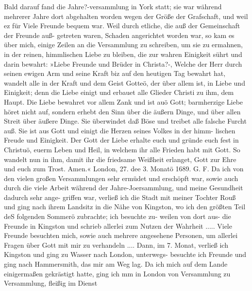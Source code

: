 Bald darauf fand die Jahre?-versammlung in York statt; sie
war während mehrerer Jahre dort abgehalten worden wegen der
Größe der Grafschaft, und weil ez für Viele Freunde bequem war.
Weil durch etliche, die auß der Gemeinschaft der Freunde auß-
getreten waren, Schaden angerichtet worden war, so kam es über
mich, einige Zeilen an die Versammlung zu schreiben, um sie zu
ermahnen, in der reinen, himmlischen Liebe zu bleiben, die zur
wahren Einigkeit sührt und darin bewahrt:
»Liebe Freunde und Brüder in Christa?-,
Welche der Herr durch seinen ewigen Arm und seine Kraft biz
auf den heutigen Tag bewahrt hat, wandelt alle in der Kraft
und dem Geist Gotteö, der über allem ist, in Liebe und Einigkeit;
denn die Liebe einigt und erbauet alle Glieder Christi zu ihm, dem
Haupt. Die Liebe bewahret vor allem Zank und ist auö Gott;
barmherzige Liebe höret nicht auf, sondern erhebt den Sinn über
die äußern Dinge, und über allen Streit über äußere Dinge.
Sie überwindet daß Böse und treibet alle falsche Furcht auß. Sie
ist aus Gott und einigt die Herzen seines Volkes in der himm-
lischen Freude und Einigkeit. Der Gott der Liebe erhalte euch
und gründe euch fest in Christuö, euerm Leben und Heil, in
welchem ihr alle Frieden habt mit Gott. So wandelt nun in
ihm, damit ihr die friedsame Weißheit erlanget, Gott zur Ehre
und euch zum Trost. Amen.«
London, 27. dee 3. Monatö 1689. G. F.
Da ich von den vielen großen Versammlungen sehr ermüdet
und erschöpft war, sowie auch durch die viele Arbeit während der
Jahre-Joersammlung, und meine Gesundheit dadurch sehr ange-
griffen war, verließ ich die Stadt mit meiner Tochter Rouß und
ging nach ihrem Landsitz in die Nähe von Kingston, wo ich den
größten Teil deS folgenden Sommerö zubrachte; ich besuchte zu-
weilen von dort aus- die Freunde in Kingston und schrieb allerlei
zum Nutzen der Wahrheit ..... Viele Freunde besuchten mich,
sowie auch mehrere angesehene Personen, um allerlei Fragen
über Gott mit mir zu verhandeln .... Dann, im 7. Monat, verließ
ich Kingston und ging zu Wasser nach London, unterwegs- besuchte
ich Freunde und ging nach Hammersmith, das mir am Weg lag.
Da ich mich auf dem Lande einigermaßen gekrästigt hatte, ging ich
mm in London von Versammlung zu Versammlung, fleißig im Dienst


